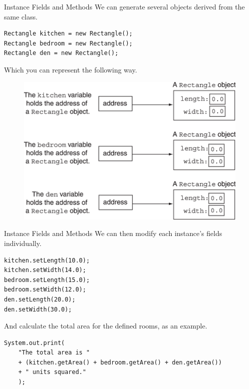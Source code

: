 \documentclass[11pt]{beamer}
\begin{document}
\begin{frame}[fragile]{Instance Fields and Methods}
\footnotesize
    We can generate several objects derived from the same class.
    \begin{lstlisting}
Rectangle kitchen = new Rectangle();
Rectangle bedroom = new Rectangle();
Rectangle den = new Rectangle();
    \end{lstlisting}
    Which you can represent the following way.
    \noindent 
    \begin{figure}[H]
    \centering
    \includegraphics[scale=0.7]{Images/chapter06_RectangleInstances.png}
    \end{figure}
\end{frame}

\begin{frame}[fragile]{Instance Fields and Methods}
    We can then modify each instance's fields individually.
    \begin{lstlisting}
kitchen.setLength(10.0);
kitchen.setWidth(14.0);
bedroom.setLength(15.0);
bedroom.setWidth(12.0);
den.setLength(20.0);
den.setWidth(30.0);
    \end{lstlisting}
    And calculate the total area for the defined rooms, as an example.
\begin{lstlisting}
System.out.print(
    "The total area is "
    + (kitchen.getArea() + bedroom.getArea() + den.getArea())
    + " units squared."
    );
\end{lstlisting}
\end{frame}
\end{document}
